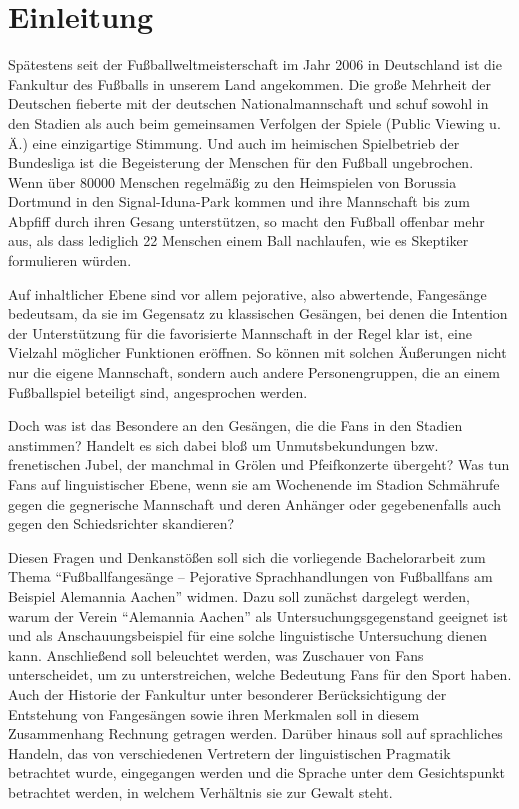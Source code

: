 \section{Einleitung}
Spätestens seit der Fußballweltmeisterschaft im Jahr 2006 in Deutschland ist die Fankultur des Fußballs in unserem Land angekommen.
Die große Mehrheit der Deutschen fieberte mit der deutschen Nationalmannschaft und schuf sowohl in den Stadien als auch beim gemeinsamen Verfolgen der Spiele (Public Viewing u. Ä.) eine einzigartige Stimmung.
Und auch im heimischen Spielbetrieb der Bundesliga ist die Begeisterung der Menschen für den Fußball ungebrochen.
Wenn über 80000 Menschen regelmäßig zu den Heimspielen von Borussia Dortmund in den Signal-Iduna-Park kommen und ihre Mannschaft bis zum Abpfiff durch ihren Gesang unterstützen, so macht den Fußball offenbar mehr aus, als dass lediglich 22 Menschen einem Ball nachlaufen, wie es Skeptiker formulieren würden.

Auf inhaltlicher Ebene sind vor allem pejorative, also abwertende, Fangesänge bedeutsam, da sie im Gegensatz zu klassischen Gesängen, bei denen die Intention der Unterstützung für die favorisierte Mannschaft in der Regel klar ist, eine Vielzahl möglicher Funktionen eröffnen.
So können mit solchen Äußerungen nicht nur die eigene Mannschaft, sondern auch andere Personengruppen, die an einem Fußballspiel beteiligt sind, angesprochen werden.

Doch was ist das Besondere an den Gesängen, die die Fans in den Stadien anstimmen?
Handelt es sich dabei bloß um Unmutsbekundungen bzw. frenetischen Jubel, der manchmal in Grölen und Pfeifkonzerte übergeht?
Was tun Fans auf linguistischer Ebene, wenn sie am Wochenende im Stadion Schmährufe gegen die gegnerische Mannschaft und deren Anhänger oder gegebenenfalls auch gegen den Schiedsrichter skandieren?

Diesen Fragen und Denkanstößen soll sich die vorliegende Bachelorarbeit zum Thema "`Fußballfangesänge – Pejorative Sprachhandlungen von Fußballfans am Beispiel Alemannia Aachen"' widmen.
Dazu soll zunächst dargelegt werden, warum der Verein "`Alemannia Aachen"' als Untersuchungsgegenstand geeignet ist und als Anschauungsbeispiel für eine solche linguistische Untersuchung dienen kann.
Anschließend soll beleuchtet werden, was Zuschauer von Fans unterscheidet, um zu unterstreichen, welche Bedeutung Fans für den Sport haben.
Auch der Historie der Fankultur unter besonderer Berücksichtigung der Entstehung von Fangesängen sowie ihren Merkmalen soll in diesem Zusammenhang Rechnung getragen werden.
Darüber hinaus soll auf sprachliches Handeln, das von verschiedenen Vertretern der linguistischen Pragmatik betrachtet wurde, eingegangen werden und die Sprache unter dem Gesichtspunkt betrachtet werden, in welchem Verhältnis sie zur Gewalt steht.

